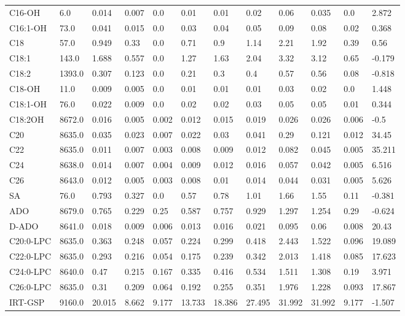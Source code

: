 \begin{tabular}{llllllllllll}
C16-OH & 6.0 & 0.014 & 0.007 & 0.0 & 0.01 & 0.01 & 0.02 & 0.06 & 0.035 & 0.0 & 2.872 \\
C16:1-OH & 73.0 & 0.041 & 0.015 & 0.0 & 0.03 & 0.04 & 0.05 & 0.09 & 0.08 & 0.02 & 0.368 \\
C18 & 57.0 & 0.949 & 0.33 & 0.0 & 0.71 & 0.9 & 1.14 & 2.21 & 1.92 & 0.39 & 0.56 \\
C18:1 & 143.0 & 1.688 & 0.557 & 0.0 & 1.27 & 1.63 & 2.04 & 3.32 & 3.12 & 0.65 & -0.179 \\
C18:2 & 1393.0 & 0.307 & 0.123 & 0.0 & 0.21 & 0.3 & 0.4 & 0.57 & 0.56 & 0.08 & -0.818 \\
C18-OH & 11.0 & 0.009 & 0.005 & 0.0 & 0.01 & 0.01 & 0.01 & 0.03 & 0.02 & 0.0 & 1.448 \\
C18:1-OH & 76.0 & 0.022 & 0.009 & 0.0 & 0.02 & 0.02 & 0.03 & 0.05 & 0.05 & 0.01 & 0.344 \\
C18:2OH & 8672.0 & 0.016 & 0.005 & 0.002 & 0.012 & 0.015 & 0.019 & 0.026 & 0.026 & 0.006 & -0.5 \\
C20 & 8635.0 & 0.035 & 0.023 & 0.007 & 0.022 & 0.03 & 0.041 & 0.29 & 0.121 & 0.012 & 34.45 \\
C22 & 8635.0 & 0.011 & 0.007 & 0.003 & 0.008 & 0.009 & 0.012 & 0.082 & 0.045 & 0.005 & 35.211 \\
C24 & 8638.0 & 0.014 & 0.007 & 0.004 & 0.009 & 0.012 & 0.016 & 0.057 & 0.042 & 0.005 & 6.516 \\
C26 & 8643.0 & 0.012 & 0.005 & 0.003 & 0.008 & 0.01 & 0.014 & 0.044 & 0.031 & 0.005 & 5.626 \\
SA & 76.0 & 0.793 & 0.327 & 0.0 & 0.57 & 0.78 & 1.01 & 1.66 & 1.55 & 0.11 & -0.381 \\
ADO & 8679.0 & 0.765 & 0.229 & 0.25 & 0.587 & 0.757 & 0.929 & 1.297 & 1.254 & 0.29 & -0.624 \\
D-ADO & 8641.0 & 0.018 & 0.009 & 0.006 & 0.013 & 0.016 & 0.021 & 0.095 & 0.06 & 0.008 & 20.43 \\
C20:0-LPC & 8635.0 & 0.363 & 0.248 & 0.057 & 0.224 & 0.299 & 0.418 & 2.443 & 1.522 & 0.096 & 19.089 \\
C22:0-LPC & 8635.0 & 0.293 & 0.216 & 0.054 & 0.175 & 0.239 & 0.342 & 2.013 & 1.418 & 0.085 & 17.623 \\
C24:0-LPC & 8640.0 & 0.47 & 0.215 & 0.167 & 0.335 & 0.416 & 0.534 & 1.511 & 1.308 & 0.19 & 3.971 \\
C26:0-LPC & 8635.0 & 0.31 & 0.209 & 0.064 & 0.192 & 0.255 & 0.351 & 1.976 & 1.228 & 0.093 & 17.867 \\
IRT-GSP & 9160.0 & 20.015 & 8.662 & 9.177 & 13.733 & 18.386 & 27.495 & 31.992 & 31.992 & 9.177 & -1.507 \\

\end{tabular}
